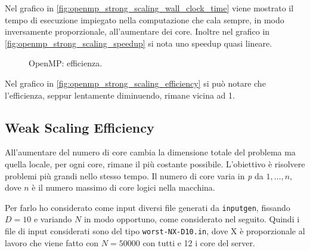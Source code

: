 \documentclass[11pt, a4paper]{article}
\begin{document}
Nel grafico in \autoref{fig:openmp_strong_scaling_wall_clock_time} viene mostrato il tempo di esecuzione impiegato nella
computazione che cala sempre, in modo inversamente proporzionale, all'aumentare dei core.
Inoltre nel grafico in \autoref{fig:openmp_strong_scaling_speedup} si nota uno speedup quasi lineare.

\begin{figure}[h]
  \centering
    \caption{\label{fig:openmp_strong_scaling_efficiency} OpenMP: efficienza.}
\end{figure}

Nel grafico in \autoref{fig:openmp_strong_scaling_efficiency} si può notare che l'efficienza, seppur lentamente diminuendo, rimane
vicina ad 1.

\subsection{Weak Scaling Efficiency}

All'aumentare del numero di core cambia la dimensione totale del problema ma quella locale, per ogni core, rimane il più costante
possibile.
L'obiettivo è risolvere problemi più grandi nello stesso tempo.
Il numero di core varia in \textit{p} da \({1, \dots, n}\), dove \(n\) è il numero massimo di core logici nella macchina.

Per farlo ho considerato come input diversi file generati da \texttt{inputgen}, fissando \(D = 10\) e variando \(N\) in modo
opportuno, come considerato nel seguito.
Quindi i file di input considerati sono del tipo \texttt{worst-NX-D10.in}, dove X è proporzionale al lavoro che viene fatto con
\(N = 50000\) con tutti e 12 i core del server.
\end{document}
